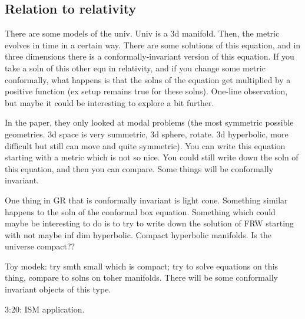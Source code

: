 \documentclass[11pt]{article}
\theoremstyle{definition}
\theoremstyle{definition}
\theoremstyle{definition}
\theoremstyle{remark}
\begin{document}
\subsection{Relation to relativity}
There are some models of the univ. Univ is a 3d manifold. Then, the metric evolves in time in a certain way. There are some solutions of this equation, and in three dimensions there is a conformally-invariant version of this equation. If you take a soln of this other eqn in relativity, and if you change some metric conformally, what happens is that the solns of the equation get multiplied by a positive function (ex setup remains true for these solns). One-line observation, but maybe it could be interesting to explore a bit further. 

In the paper, they only looked at modal problems (the most symmetric possible geometries. 3d space is very summetric, 3d sphere, rotate. 3d hyperbolic, more difficult but still can move and quite symmetric). You can write this equation starting with a metric which is not so nice. You could still write down the soln of this equation, and then you can compare. Some things will be conformally invariant. 

One thing in GR that is conformally invariant is light cone. Something similar happens to the soln of the conformal box equation. Something which could maybe be interesting to do is to try to write down the solution of FRW starting with not maybe inf dim hyperbolic. Compact hyperbolic manifolds. Is the universe compact??

Toy modek: try smth small which is compact; try to solve equations on this thing, compare to solns on toher manifolds. There will be some conformally invariant objects of this type. 

3:20: ISM application. 
\end{document}

